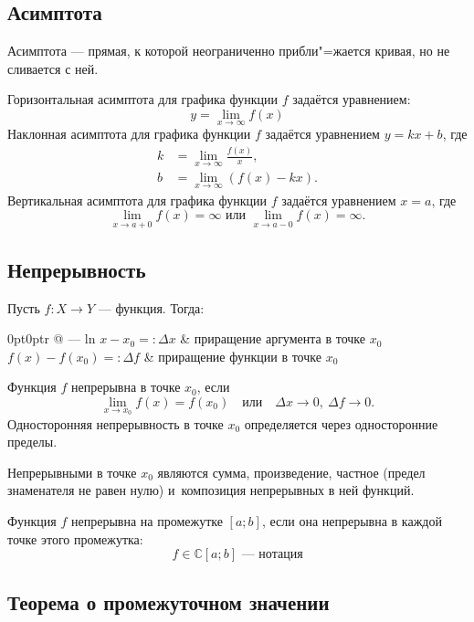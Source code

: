 \subsection{Асимптота}

{\bold Асимптота} --- прямая, к которой {\ital неограниченно} прибли"=жается кривая, но не сливается с ней.

{\ital Горизонтальная асимптота} для графика функции $f$ задаётся уравнением:
$$y=\lim_{x\to\infty}f(x)$$
{\ital Наклонная асимптота} для графика функции $f$ задаётся уравнением $y=kx+b$, где
\begin{align*}
k&=\lim_{x\to\infty}\frac{f(x)}{x},\\
b&=\lim_{x\to\infty}(f(x)-kx).
\end{align*}
{\ital Вертикальная асимптота} для графика функции $f$ задаётся уравнением $x=a$, где
$$\lim_{x\to a+0}f(x)=\infty\text{ или }\lim_{x\to a-0}f(x)=\infty.$$

\subsection{Непрерывность}

Пусть $f\colon X\to Y$ --- функция. Тогда:

\begin{tabularc}{0pt}{0pt}{r @{ --- } l}{n}
$x-x_0=:\Delta x$ & {\ital приращение аргумента} в точке $x_0$\\
$f(x)-f(x_0)=:\Delta f$ & {\ital приращение функции} в точке $x_0$
\end{tabularc}

Функция $f$ {\bold непрерывна} {\ital в точке} $x_0$, если
$$\lim_{x\to x_0}f(x)=f(x_0)\quad\text{или}\quad\Delta x\to 0,\ \Delta f\to 0.$$
{\ital Односторонняя непрерывность} в точке $x_0$ определяется через односторонние пределы.

Непрерывными в точке $x_0$ являются {\ital сумма}, {\ital произведение}, {\ital частное {\color{desc}(предел знаменателя не равен нулю)}} и~{\ital композиция} непрерывных в ней функций.

Функция $f$ {\bold непрерывна} {\ital на промежутке} $[a;b]$, если она непрерывна в каждой точке этого промежутка:
$$f\in\mathbb{C}[a;b]\text{ --- нотация}$$

\subsection{Теорема о промежуточном значении}

